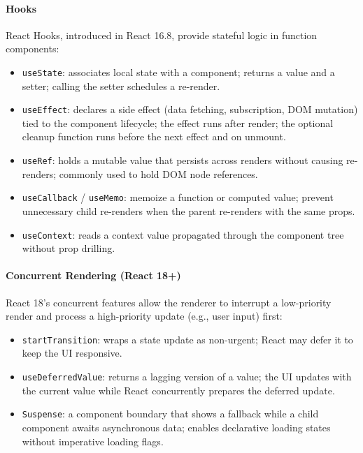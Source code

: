 \paragraph{Hooks}

React Hooks, introduced in React 16.8, provide stateful logic in function components:
\begin{itemize}
    \item \texttt{useState}: associates local state with a component; returns a value and a setter; calling the setter schedules a re-render.
    \item \texttt{useEffect}: declares a side effect (data fetching, subscription, DOM mutation) tied to the component lifecycle; the effect runs after render; the optional cleanup function runs before the next effect and on unmount.
    \item \texttt{useRef}: holds a mutable value that persists across renders without causing re-renders; commonly used to hold DOM node references.
    \item \texttt{useCallback} / \texttt{useMemo}: memoize a function or computed value; prevent unnecessary child re-renders when the parent re-renders with the same props.
    \item \texttt{useContext}: reads a context value propagated through the component tree without prop drilling.
\end{itemize}

\paragraph{Concurrent Rendering (React 18+)}

React 18's concurrent features allow the renderer to interrupt a low-priority render and process a high-priority update (e.g., user input) first:
\begin{itemize}
    \item \texttt{startTransition}: wraps a state update as non-urgent; React may defer it to keep the UI responsive.
    \item \texttt{useDeferredValue}: returns a lagging version of a value; the UI updates with the current value while React concurrently prepares the deferred update.
    \item \texttt{Suspense}: a component boundary that shows a fallback while a child component awaits asynchronous data; enables declarative loading states without imperative loading flags.
\end{itemize}

